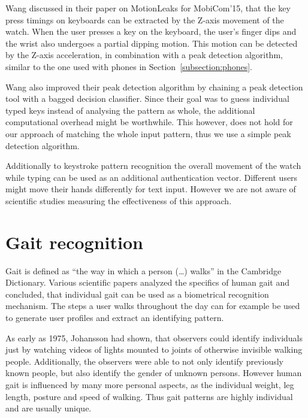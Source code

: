 Wang \etal\cite{wang2015mole} discussed in their paper on MotionLeaks for MobiCom'15, that the key press timings on keyboards can be extracted by the Z-axis movement of the watch. When the user presses a key on the keyboard, the user's finger dips and the wrist also undergoes a partial dipping motion. This motion can be detected by the Z-axis acceleration, in combination with a peak detection algorithm, similar to the one used with phones in Section~\ref{subsection:phones}.

Wang \etal also improved their peak detection algorithm by chaining a peak detection tool with a bagged decision classifier. Since their goal was to guess individual typed keys instead of analysing the pattern as whole, the additional computational overhead might be worthwhile. This however, does not hold for our approach of matching the whole  input pattern, thus we use a simple peak detection algorithm.

Additionally to keystroke pattern recognition the overall movement of the watch while typing can be used as an additional authentication vector. Different users might move their hands differently for text input. However we are not aware of scientific studies measuring the effectiveness of this approach.

\section{Gait recognition}
Gait is defined as ``the way in which a person (\ldots) walks'' in the Cambridge Dictionary. Various scientific papers analyzed the specifics of human gait\cite{johansson1975visual, lee2002gait, johnstonsmartwatch} and concluded, that individual gait can be used as a biometrical recognition mechanism. The steps a user walks throughout the day can for example be used to generate user profiles and extract an identifying pattern. 

As early as 1975, Johansson\cite{johansson1975visual} had shown, that observers could identify individuals just by watching videos of lights mounted to joints of otherwise invisible walking people. Additionally, the observers were able to not only identify previously known people, but also identify the gender of unknown persons. However human gait is influenced by many more personal aspects, as the individual weight, leg length, posture and speed of walking. Thus gait patterns are highly individual and are usually unique.
